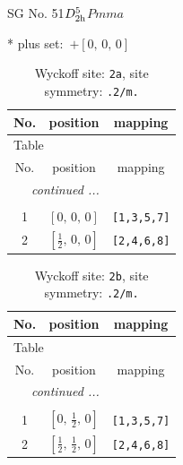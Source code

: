 \documentclass[fleqn,8pt]{jsarticle}
\begin{document}
\setcounter{MaxMatrixCols}{32}

\renewcommand{\tablename}{Table~}
\renewcommand{\figurename}{Figure~}
\begin{center}
\LARGE
SG No. 51\quad$D_{\rm 2h}^{5}$\quad$Pmma$\quad[ orthorhombic ]
\end{center}
* plus set:\,\,\,$+\left[ 0,\, 0,\, 0 \right]$
\renewcommand{\arraystretch}{1.2}
\begin{longtable}{ccc}
\caption{Wyckoff site: {\tt 2a}, site symmetry: {\tt .2/m.}}
 \\
 \hline \hline
No. & position & mapping \\ \hline \endfirsthead

\multicolumn{2}{l}{\tablename\ \thetable{}} \\
 \hline \hline
No. & position & mapping \\ \hline \endhead

 \hline \hline
\multicolumn{2}{r}{\footnotesize\it continued ...} \\ \endfoot

 \hline \hline
\multicolumn{2}{r}{} \\ \endlastfoot

1 & $\left[ 0,\, 0,\, 0 \right]$ & {\tt [1,3,5,7]} \\ \hline
2 & $\left[ \frac{1}{2},\, 0,\, 0 \right]$ & {\tt [2,4,6,8]} \\
\end{longtable}
\renewcommand{\arraystretch}{1.2}
\begin{longtable}{ccc}
\caption{Wyckoff site: {\tt 2b}, site symmetry: {\tt .2/m.}}
 \\
 \hline \hline
No. & position & mapping \\ \hline \endfirsthead

\multicolumn{2}{l}{\tablename\ \thetable{}} \\
 \hline \hline
No. & position & mapping \\ \hline \endhead

 \hline \hline
\multicolumn{2}{r}{\footnotesize\it continued ...} \\ \endfoot

 \hline \hline
\multicolumn{2}{r}{} \\ \endlastfoot

1 & $\left[ 0,\, \frac{1}{2},\, 0 \right]$ & {\tt [1,3,5,7]} \\ \hline
2 & $\left[ \frac{1}{2},\, \frac{1}{2},\, 0 \right]$ & {\tt [2,4,6,8]} \\
\end{longtable}
\end{document}
